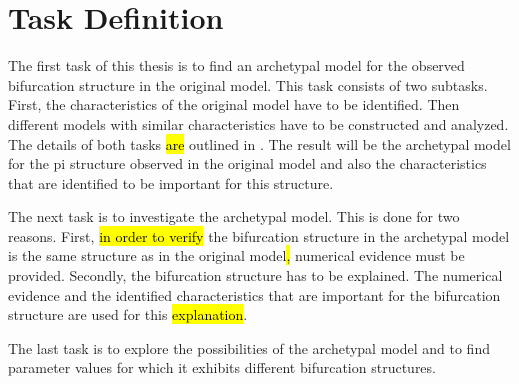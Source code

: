\chapter{Task Definition}
\label{chap:task}

The first task of this thesis is to find an archetypal model for the observed bifurcation structure in the original model.
This task consists of two subtasks.
First, the characteristics of the original model have to be identified.
Then different models with similar characteristics have to be constructed and analyzed.
The details of both tasks \hl{are} outlined in .
The result will be the archetypal model for the \gls{pi} structure observed in the original model and also the characteristics that are identified to be important for this structure.

The next task is to investigate the archetypal model.
This is done for two reasons.
First, \hl{in order to verify} the bifurcation structure in the archetypal model is the same structure as in the original model\hl{, }numerical evidence must be provided.
Secondly, the bifurcation structure has to be explained.
The numerical evidence and the identified characteristics that are important for the bifurcation structure are used for this \hl{explanation}.

The last task is to explore the possibilities of the archetypal model and to find parameter values for which it exhibits different bifurcation structures.
